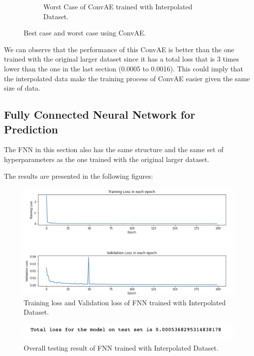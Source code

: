 \begin{figure}[H]
\begin{subfigure}{0.45\textwidth}
    \caption{Worst Case of ConvAE trained with Interpolated Dataset.}
\end{subfigure}
        
\caption{Best case and worst case using ConvAE.}
\end{figure}

We can observe that the performance of this ConvAE is better than the one trained with the original larger dataset since it has a total loss that is 3 times lower than the one in the last section (0.0005 to 0.0016). This could imply that the interpolated data make the training process of ConvAE easier given the same size of data. 


\subsection{Fully Connected Neural Network for Prediction}

The FNN in this section also has the same structure and the same set of hyperparameters as the one trained with the original larger dataset.

The results are presented in the following figures:

\begin{figure}[H]
    \caption{Training loss and Validation loss of FNN trained with Interpolated Dataset.}
    \includegraphics[scale=0.6]{figures/mantle_convection_images/larger_dataset_interpolated/FNN_trainingData.png}
\end{figure}

\begin{figure}[H]
    \caption{Overall testing result of FNN trained with Interpolated Dataset.}
    \includegraphics[scale=0.8]{figures/mantle_convection_images/larger_dataset_interpolated/FNN_OverallTesting.png}
\end{figure}

